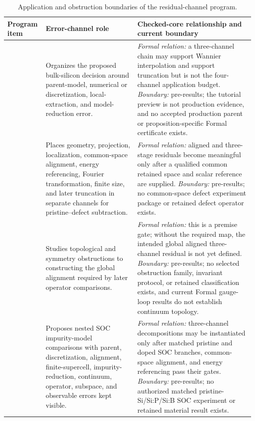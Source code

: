 \begin{table}[ht]
\centering
\footnotesize
\begin{tabularx}{\textwidth}{@{}l Y Y@{}}
\toprule
Program item & Error-channel role & Checked-core relationship and current boundary \\
\midrule
{}
  & Organizes the proposed bulk-silicon decision around parent-model, numerical or
    discretization, local-extraction, and model-reduction error.
  & \emph{Formal relation:} a three-channel chain may support Wannier interpolation and
    support truncation but is not the four-channel application budget.  \emph{Boundary:}
    pre-results; the tutorial preview is not production evidence, and no accepted
    production parent or proposition-specific Formal certificate exists. \\
  & Places geometry, projection, localization, common-space alignment, energy
    referencing, Fourier transformation, finite size, and later truncation in separate
    channels for pristine--defect subtraction.
  & \emph{Formal relation:} aligned and three-stage residuals become meaningful only
    after a qualified common retained space and scalar reference are supplied.
    \emph{Boundary:} pre-results; no common-space defect experiment package or retained
    defect operator exists. \\
  & Studies topological and symmetry obstructions to constructing the global alignment
    required by later operator comparisons.
  & \emph{Formal relation:} this is a premise gate; without the required map, the
    intended global aligned three-channel residual is not yet defined.  \emph{Boundary:}
    pre-results; no selected obstruction family, invariant protocol, or retained
    classification exists, and current Formal gauge-loop results do not establish
    continuum topology. \\
  & Proposes nested SOC impurity-model comparisons with parent, discretization,
    alignment, finite-supercell, impurity-reduction, continuum, operator, subspace, and
    observable errors kept visible.
  & \emph{Formal relation:} three-channel decompositions may be instantiated only after
    matched pristine and doped SOC branches, common-space alignment, and energy
    referencing pass their gates.  \emph{Boundary:} pre-results; no authorized matched
    pristine-Si/Si:P/Si:B SOC experiment or retained material result exists. \\
\bottomrule
\end{tabularx}
\caption{Application and obstruction boundaries of the residual-channel program.}
\label{tab:seven-paper-error-channel-crosswalk-applications}
\end{table}
\FloatBarrier

